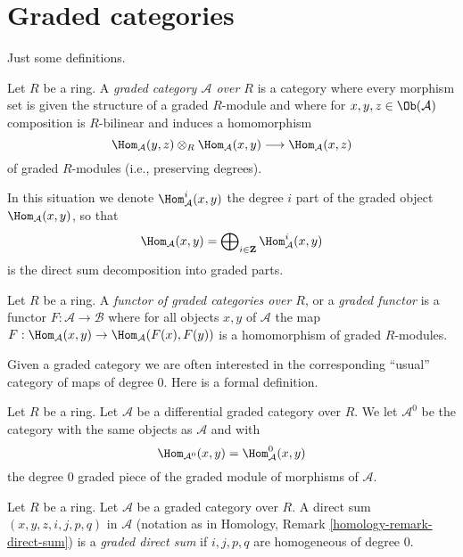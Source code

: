\section{Graded categories}
\label{section-graded}

\noindent
Just some definitions.

\begin{definition}
\label{definition-graded-category}
Let $R$ be a ring. A {\it graded category $\mathcal{A}$
over $R$} is a category where every morphism set is given the structure
of a graded $R$-module and where for
$x, y, z \in \Ob(\mathcal{A})$ composition is $R$-bilinear and induces
a homomorphism
$$
\Hom_\mathcal{A}(y, z) \otimes_R \Hom_\mathcal{A}(x, y)
\longrightarrow
\Hom_\mathcal{A}(x, z)
$$
of graded $R$-modules (i.e., preserving degrees).
\end{definition}

\noindent
In this situation we denote $\Hom_\mathcal{A}^i(x, y)$ the degree $i$
part of the graded object $\Hom_\mathcal{A}(x, y)$, so that
$$
\Hom_\mathcal{A}(x, y) =
\bigoplus\nolimits_{i \in \mathbf{Z}} \Hom_\mathcal{A}^i(x, y)
$$
is the direct sum decomposition into graded parts.

\begin{definition}
\label{definition-functor-graded-categories}
Let $R$ be a ring. A {\it functor of graded categories over $R$}, or a
{\it graded functor}
is a functor $F : \mathcal{A} \to \mathcal{B}$ where for all objects
$x, y$ of $\mathcal{A}$ the map
$F : \Hom_\mathcal{A}(x, y) \to \Hom_\mathcal{A}(F(x), F(y))$
is a homomorphism of graded $R$-modules.
\end{definition}

\noindent
Given a graded category we are often interested in the
corresponding ``usual'' category of maps of degree $0$.
Here is a formal definition.

\begin{definition}
\label{definition-H0-of-graded-category}
Let $R$ be a ring. Let $\mathcal{A}$ be a differential graded category
over $R$. We let {\it $\mathcal{A}^0$} be the category with the
same objects as $\mathcal{A}$ and with
$$
\Hom_{\mathcal{A}^0}(x, y) = \Hom^0_\mathcal{A}(x, y)
$$
the degree $0$ graded piece of the graded module of morphisms of
$\mathcal{A}$.
\end{definition}

\begin{definition}
\label{definition-graded-direct-sum}
Let $R$ be a ring. Let $\mathcal{A}$ be a graded category over $R$.
A direct sum $(x, y, z, i, j, p, q)$ in $\mathcal{A}$ (notation as in
Homology, Remark \ref{homology-remark-direct-sum})
is a {\it graded direct sum} if $i, j, p, q$ are homogeneous
of degree $0$.
\end{definition}


